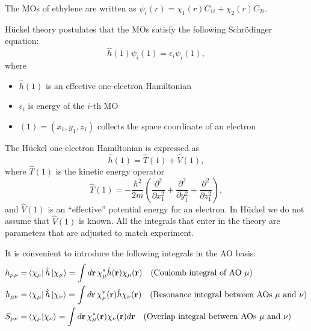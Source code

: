 \documentclass[../Main/chem532-notes.tex]{subfiles}
\begin{document}
\begin{example}
The MOs of ethylene are written as $\psi_i(r) = \chi_1(r) C_{1 i} + \chi_2(r) C_{2 i}$.
\end{example}

H\"{u}ckel theory postulates that the MOs satisfy the following Schr\"{o}dinger equation:
\begin{equation}
\label{eq:huckel:schrodinger equation}
\hat{h}(1) \psi_i(1) = \epsilon_i \psi_i(1),
\end{equation}
where
\begin{itemize}
\item $\hat{h}(1)$ is an effective one-electron Hamiltonian
\item $\epsilon_i$ is energy of the $i$-th MO
\item $(1) = (x_1,y_1,z_1)$ collects the space coordinate of an electron
\end{itemize}

The H\"{u}ckel one-electron Hamiltonian is expressed as
\begin{equation}
\hat{h}(1) = \hat{T}(1) + \hat{V}(1),
\end{equation}
where $\hat{T}(1)$ is the kinetic energy operator
\begin{equation}
\hat{T}(1) = -\frac{\hbar^2}{2 m}\left( \frac{\partial^2}{\partial x_1^2} + \frac{\partial^2}{\partial y_1^2} + \frac{\partial^2}{\partial z_1^2} \right),
\end{equation}
and $\hat{V}(1)$ is an ``effective'' potential energy for an electron.
In H\"{u}ckel we do not assume that $\hat{V}(1)$ is known. All the integrals that enter in the theory are parameters that are adjusted to match experiment.

It is convenient to introduce the following integrals in the AO basis:
\begin{align}
h_{\mu \mu} = & \bra{\chi_\mu} \hat{h} \ket{\chi_\mu} =   \int d\mathbf{r} \, \chi_\mu^* \hat{h}(\mathbf{r}) \chi_\mu(\mathbf{r})  \quad \text{(Coulomb integral of AO $\mu$)} \\
h_{\mu \nu} = & \bra{\chi_\mu} \hat{h} \ket{\chi_\nu} =  \int d\mathbf{r} \, \chi_\mu^*(\mathbf{r}) \hat{h} \chi_\nu(\mathbf{r}) \quad \text{(Resonance integral between AOs $\mu$ and $\nu$)} \\
S_{\mu \nu} = &  \braket{\chi_\mu | \chi_\nu} =  \int d\mathbf{r} \,  \chi_\mu^*(\mathbf{r}) \chi_\nu(\mathbf{r}) d\mathbf{r} \quad \text{(Overlap integral between AOs $\mu$ and $\nu$)}
\end{align}
\end{document}
